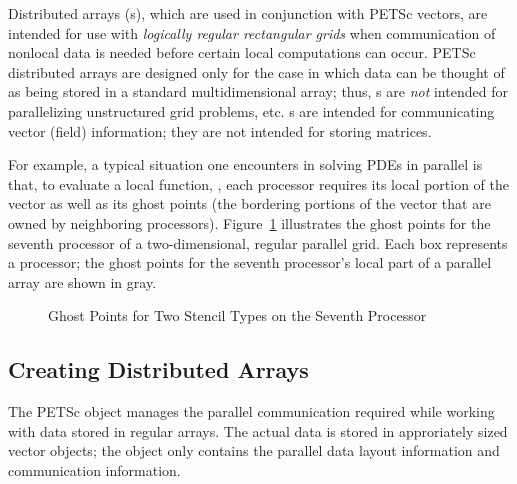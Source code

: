   Distributed arrays (s), which are used in
conjunction with PETSc vectors, are intended for use with {\em
logically regular rectangular grids} when communication of nonlocal data is
needed before certain local computations can occur.  PETSc distributed
arrays are designed only for the case in which data can be thought of
as being stored in a standard multidimensional array; thus, s 
are {\em not} intended for parallelizing unstructured grid problems, etc.
s are intended for communicating vector (field) information; they 
are not intended for storing matrices. 

For example, a typical situation one encounters in solving 
PDEs in parallel is that, to evaluate a local function, , each processor
requires its local portion of the vector  as well as its ghost
points  (the bordering portions of the vector
that are owned by neighboring processors).  Figure~\ref{fig:ghosts}
illustrates the ghost points for the seventh processor of a
two-dimensional, regular parallel grid.  Each box represents a
processor; the ghost points for the seventh processor's local part of
a parallel array are shown in gray.

\begin{figure}[tb]
\centerline{\immediate {} \pdfrefximage \pdflastximage}
\caption{Ghost Points for Two Stencil Types on the Seventh Processor}
\label{fig:ghosts}
\end{figure}

\subsection{Creating Distributed Arrays}

The PETSc  object manages the parallel communication required
while working with data stored in regular arrays. The actual data
is stored in approriately sized vector objects; the  object 
only contains the parallel data layout information and communication
information. 

